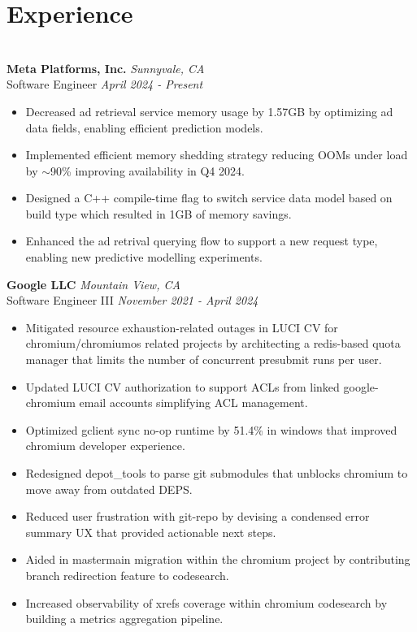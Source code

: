 \documentclass{resume}
\author{https://aravindvasudev.github.io/}{Aravind Vasudevan}
\begin{document}
\maketitle
\section*{Experience}
\titlerule[0.2pt]
\noindent
\\
\textbf{Meta Platforms, Inc.} \hfill \textit{Sunnyvale, CA} \\
{\small Software Engineer} \hfill \textit{\small April 2024 - Present}
\begin{itemize}
  \item Decreased ad retrieval service memory usage by 1.57GB by optimizing ad data fields, enabling efficient prediction models.
  \item Implemented efficient memory shedding strategy reducing OOMs under load by $\sim$90\% improving availability in Q4 2024.
  \item Designed a C++ compile-time flag to switch service data model based on build type which resulted in 1GB of memory savings.
  \item Enhanced the ad retrival querying flow to support a new request type, enabling new predictive modelling experiments.
\end{itemize}
\textbf{Google LLC} \hfill \textit{Mountain View, CA} \\
{\small Software Engineer III} \hfill \textit{\small November 2021 - April 2024}
\begin{itemize}
  \item Mitigated resource exhaustion-related outages in LUCI CV for chromium/chromiumos related projects by architecting a redis-based quota manager that limits the number of concurrent presubmit runs per user.
  \item Updated LUCI CV authorization to support ACLs from linked google-chromium email accounts simplifying ACL management.
  \item Optimized gclient sync no-op runtime by 51.4\% in windows that improved chromium developer experience.
  \item Redesigned depot\_tools to parse git submodules that unblocks chromium to move away from outdated DEPS.
  \item Reduced user frustration with git-repo by devising a condensed error summary UX that provided actionable next steps.
  \item Aided in master\textrightarrow main migration within the chromium project by contributing branch redirection feature to codesearch.
  \item Increased observability of xrefs coverage within chromium codesearch by building a metrics aggregation pipeline.
\end{itemize}
\end{document}
